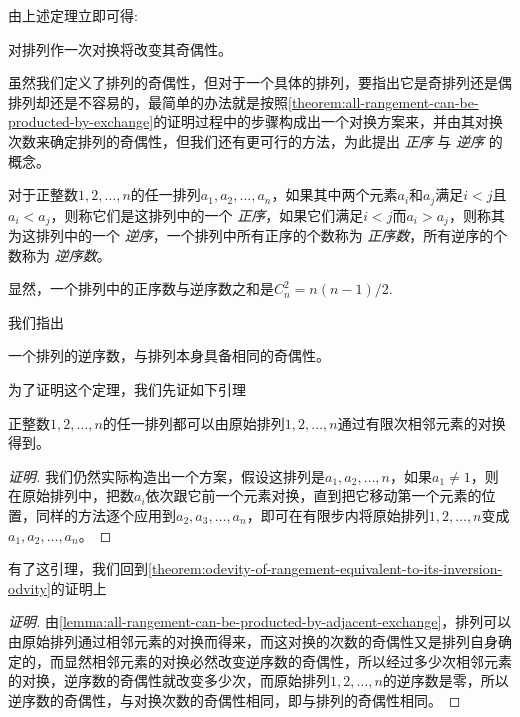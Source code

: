 由上述定理立即可得:
\begin{theorem}
  对排列作一次对换将改变其奇偶性。
\end{theorem}

虽然我们定义了排列的奇偶性，但对于一个具体的排列，要指出它是奇排列还是偶排列却还是不容易的，最简单的办法就是按照\autoref{theorem:all-rangement-can-be-producted-by-exchange}的证明过程中的步骤构成出一个对换方案来，并由其对换次数来确定排列的奇偶性，但我们还有更可行的方法，为此提出 \emph{正序} 与 \emph{逆序} 的概念。
\begin{definition}
  对于正整数$1,2,\ldots,n$的任一排列$a_1,a_2,\ldots,a_n$，如果其中两个元素$a_i$和$a_j$满足$i<j$且$a_i<a_j$，则称它们是这排列中的一个 \emph{正序}，如果它们满足$i<j$而$a_i>a_j$，则称其为这排列中的一个 \emph{逆序}，一个排列中所有正序的个数称为 \emph{正序数}，所有逆序的个数称为 \emph{逆序数}。
\end{definition}

显然，一个排列中的正序数与逆序数之和是$C_n^2=n(n-1)/2$.

我们指出
\begin{theorem}
  \label{theorem:odevity-of-rangement-equivalent-to-its-inversion-odvity}
  一个排列的逆序数，与排列本身具备相同的奇偶性。
\end{theorem}

为了证明这个定理，我们先证如下引理
\begin{lemma}
  \label{lemma:all-rangement-can-be-producted-by-adjacent-exchange}
  正整数$1,2,\ldots,n$的任一排列都可以由原始排列$1,2,\ldots,n$通过有限次相邻元素的对换得到。
\end{lemma}

\begin{proof}[证明]
  我们仍然实际构造出一个方案，假设这排列是$a_1,a_2,\ldots,n$，如果$a_1 \neq 1$，则在原始排列中，把数$a_i$依次跟它前一个元素对换，直到把它移动第一个元素的位置，同样的方法逐个应用到$a_2,a_3,\ldots,a_n$，即可在有限步内将原始排列$1,2,\ldots,n$变成$a_1,a_2,\ldots,a_n$。
\end{proof}

有了这引理，我们回到\autoref{theorem:odevity-of-rangement-equivalent-to-its-inversion-odvity}的证明上
\begin{proof}[证明]
   由\autoref{lemma:all-rangement-can-be-producted-by-adjacent-exchange}，排列可以由原始排列通过相邻元素的对换而得来，而这对换的次数的奇偶性又是排列自身确定的，而显然相邻元素的对换必然改变逆序数的奇偶性，所以经过多少次相邻元素的对换，逆序数的奇偶性就改变多少次，而原始排列$1,2,\ldots,n$的逆序数是零，所以逆序数的奇偶性，与对换次数的奇偶性相同，即与排列的奇偶性相同。
\end{proof}


